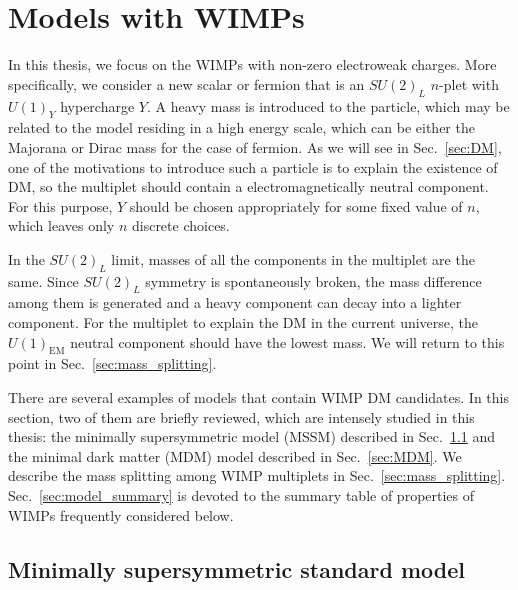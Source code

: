 \documentclass[12pt,twoside,book]{article}
\begin{document}
\section{Models with WIMPs}
\setcounter{equation}{0}
\label{sec:model}

\vskip 0.1in

In this thesis, we focus on the WIMPs with non-zero electroweak charges.
More specifically, we consider a new scalar or fermion that is an $SU(2)_L$ $n$-plet with $U(1)_Y$ hypercharge $Y$.
A heavy mass is introduced to the particle, which may be related to the model residing in a high energy scale, which can be either the Majorana or Dirac mass for the case of fermion.
As we will see in Sec.~\ref{sec:DM}, one of the motivations to introduce such a particle is to explain the existence of DM, so the multiplet should contain a electromagnetically neutral component.
For this purpose, $Y$ should be chosen appropriately for some fixed value of $n$, which leaves only $n$ discrete choices.

In the $SU(2)_L$ limit, masses of all the components in the multiplet are the same.
Since $SU(2)_L$ symmetry is spontaneously broken, the mass difference among them is generated and a heavy component can decay into a lighter component.
For the multiplet to explain the DM in the current universe, the $U(1)_{\mathrm{EM}}$ neutral component should have the lowest mass.
We will return to this point in Sec.~\ref{sec:mass_splitting}.

There are several examples of models that contain WIMP DM candidates.
In this section, two of them are briefly reviewed, which are intensely studied in this thesis: the minimally supersymmetric model (MSSM) described in Sec.~\ref{sec:MSSM} and the minimal dark matter (MDM) model described in Sec.~\ref{sec:MDM}.
We describe the mass splitting among WIMP multiplets in Sec.~\ref{sec:mass_splitting}.
Sec.~\ref{sec:model_summary} is devoted to the summary table of properties of WIMPs frequently considered below.

\subsection{Minimally supersymmetric standard model}
\label{sec:MSSM}
\end{document}
